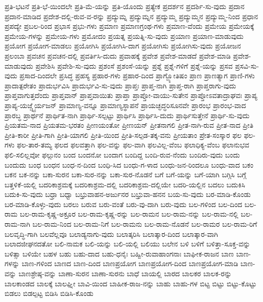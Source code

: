 ಪ್ರತಿ-ಭಟನೆ
ಪ್ರತಿ-ಭೆ-ಯಿಂದಲೇ
ಪ್ರತಿ-ಮೆ-ಯನ್ನು
ಪ್ರತಿ-ಯೊಂದು
ಪ್ರತ್ಯೇಕ
ಪ್ರದರ್ಶನ
ಪ್ರದರ್ಶಿ-ಸು-ವುದು
ಪ್ರದಾನ
ಪ್ರದಾನ-ಮಾಡಿದ
ಪ್ರದೇಶ-ದಲ್ಲಿ-ರುವ-ವ-ರನ್ನು
ಪ್ರದ್ಯುಮ್ನ
ಪ್ರದ್ಯುಮ್ನನ
ಪ್ರದ್ಯುಮ್ಮ
ಪ್ರದ್ಯುಮ್ಮನ
ಪ್ರದ್ಯುಮ್ಮ-ನಿಂದ
ಪ್ರಧಾನ
ಪ್ರಪದ್ಯೇ
ಪ್ರಬಲ-ರಿಂದ
ಪ್ರಭಾಸ
ಪ್ರಭು-ಗಳು
ಪ್ರಮಾಣ
ಪ್ರಮಾಣಗ್ರಂಥ-ಗಳು
ಪ್ರಮಾಣ-ವೆಂದು
ಪ್ರಮೇಯ
ಪ್ರಮೇಯಕ್ಕೆ
ಪ್ರಮೇಯ-ಗಳನ್ನು
ಪ್ರಮೇಯ-ಗಳು
ಪ್ರಮೋದಂ
ಪ್ರಯತ್ನ
ಪ್ರಯತ್ನಿ-ಸು-ವುದು
ಪ್ರಯಾಣ
ಪ್ರಯಾಣ-ಮಾಡುವುದು
ಪ್ರಯೋಗ
ಪ್ರಯೋಗ-ಮಾಡಲು
ಪ್ರಯೋಗಿಸಿ
ಪ್ರಯೋಗಿಸಿ-ದಾಗ
ಪ್ರಯೋಗಿಸು
ಪ್ರಯೋಗಿಸು-ವುದು
ಪ್ರಯೋಜನ
ಪ್ರಲಂಬಾ
ಪ್ರವಚನ
ಪ್ರವಚನ-ದಲ್ಲಿ
ಪ್ರವರ್ತಿಸಿ-ದುದು
ಪ್ರವಾಹಕ್ಕೆ
ಪ್ರವೇಶ
ಪ್ರವೇಶ-ಮಾಡದೆ
ಪ್ರವೇಶ-ಮಾಡಿ
ಪ್ರವೇಶ-ಮಾಡುವುದು
ಪ್ರವೇಶಿಸಿ
ಪ್ರವೇಶಿ-ಸು-ವುದು
ಪ್ರಶಂಸೆ
ಪ್ರಶಂಸೆ-ಯನ್ನು
ಪ್ರಶ್ನೆ
ಪ್ರಶ್ನೆ-ಗಳಿಗೆ
ಪ್ರಶ್ನೆ-ಯನ್ನು
ಪ್ರಸವ
ಪ್ರಸವಿ-ಸು-ವುದು
ಪ್ರಸಾದ-ದಿಂದಲೇ
ಪ್ರಸಿದ್ಧ
ಪ್ರಹಸ್ಯ
ಪ್ರಹಾರ-ಗಳು
ಪ್ರಹಾರ-ದಿಂದ
ಪ್ರಾಗ್ಜ್ಯೋತಿಷಂ
ಪ್ರಾಣ
ಪ್ರಾಣತ್ಯಾಗ
ಪ್ರಾಣಿ-ಗಳು
ಪ್ರಾದಾತ್ಪರೇತಂ
ಪ್ರಾದುರ್ಭವಿಸಿ
ಪ್ರಾದುರ್ಭವಿ-ಸು-ವುದು
ಪ್ರಾಪ್ತಃ
ಪ್ರಾಪ್ತ-ನಾಗಿ
ಪ್ರಾಪ್ತ-ರಾಗಿ
ಪ್ರಾಪ್ತರಾಗು-ವುದು
ಪ್ರಾಪ್ತವಾಗುತ್ತದೆಂದು
ಪ್ರಾಪ್ತವಾನ್
ಪ್ರಾಪ್ತವಾಯಿತು
ಪ್ರಾಪ್ತಾ
ಪ್ರಾಪ್ತೋ-ವಾಯು-ಸುತೇನ
ಪ್ರಾಪ್ತೋಽವತಾದ್ರಾಘವಃ
ಪ್ರಾಪ್ಯ
ಪ್ರಾಪ್ಯ-ಯಜ್ಚ್ನೈರ್ಯಜನ್
ಪ್ರಾಮಾಣ್ಯ-ವನ್ನೂ
ಪ್ರಾಮಾಣ್ಯಸ್ಥಾಪನೆ
ಪ್ರಾಯಚ್ಛದ್ಧರಿಸೂನವೇ
ಪ್ರಾರಂಭ
ಪ್ರಾರಂಭ-ವಾದ
ಪ್ರಾರಬ್ಧ
ಪ್ರಾರ್ಥನೆ
ಪ್ರಾರ್ಥಿತ-ನಾಗಿ
ಪ್ರಾರ್ಥಿ-ಸಲ್ಪಟ್ಟು
ಪ್ರಾರ್ಥಿಸಿ
ಪ್ರಾರ್ಥಿಸಿ-ದುದು
ಪ್ರಾರ್ಥಿಸುತ್ತೇನೆ
ಪ್ರಾರ್ಥಿ-ಸು-ವುದು
ಪ್ರಿಯತಮ-ನಾದ
ಪ್ರಿಯತಮ-ಭರತಂ
ಪ್ರೀಣಯಂತೋ
ಪ್ರೀಣಯನ್
ಪ್ರೀತನಾಗಲಿ
ಪ್ರೀತ-ನಾಗಿ-ರುವ
ಪ್ರೀತ-ನಾದ
ಪ್ರೀತಿ
ಪ್ರೀತಿ-ಕಾರೀ
ಪ್ರೀತಿ-ಗಾಗಿ
ಪ್ರೀತಿ-ಯಾಗಲಿ
ಪ್ರೀತಿ-ಯಿಂದ
ಪ್ರೀತಿ-ಸಲ್ಪಡ-ತಕ್ಕ-ವನು
ಪ್ರೀಯತಾಂ
ಪ್ರೇತ-ಸಂಸ್ಕಾರ
ಫಲ
ಫಲ-ಗಳು
ಫಲ-ತಾರ-ತಮ್ಯ
ಫಲದ
ಫಲವತ್ತಾಗಿ
ಫಲ-ವನ್ನು
ಫಲ-ವಾಗಿ
ಫಲವಿಲ್ಲ-ವೆಂಬ
ಫಲಾಧಿಕ್ಯ-ವೆಂಬ
ಫಲಾನುಭವ
ಫಲಿ-ಸಲಿಲ್ಲವೋ
ಫಲ್ಗುನಂ
ಬಂದ
ಬಂದನೋ
ಬಂದಾಗ
ಬಂದಿದ್ದ
ಬಂದಿ-ರುವ-ನೆಂದು
ಬಂದಿರು-ವುದು
ಬಂದು
ಬಂದುದು
ಬಂಧ
ಬಂಧನ
ಬಂಧ-ನ-ದಿಂದ
ಬಂಧಿ-ಸಿದ
ಬಂಧು-ಗ-ಳಾದ
ಬಂಧು-ಜನ-ರಿಂದಲೂ
ಬಂಧು-ವಾದ
ಬಕಂ
ಬಕನ
ಬಕ-ನನ್ನು
ಬಕಾ-ಸುರನ
ಬಕಾ-ಸುರ-ನನ್ನು
ಬಕಾ-ಸುರ-ನೊಡನೆ
ಬಗೆ
ಬಗೆ-ಯನ್ನು
ಬಗೆ-ಯಾಗಿ
ಬಗ್ಗಿಸಿ
ಬಗ್ಗೆ
ಬತ್ತಳಿಕೆ-ಯಲ್ಲಿ
ಬದರಿಕಾಶ್ರಮಕ್ಕೆ
ಬದರಿಕಾಶ್ರಮ-ದಲ್ಲಿ
ಬದರಿಕಾಶ್ರಮ-ದಲ್ಲಿಯೇ
ಬದರಿ-ಯಲ್ಲಿನ
ಬದಲು
ಬದುಕಿಸಿ
ಬದುಕಿ-ಸು-ವುದು
ಬಧ್ರಾ
ಬಧ್ವಾ
ಬಭ್ರುವಾಹನ-ಅರ್ಜುನರ
ಬಭ್ರುವಾ-ಹನನ
ಬಯ-ಸು-ವುದು
ಬರ-ಮಾಡಿ-ಕೊಂಡು
ಬರ-ಮಾಡಿ-ಕೊಳ್ಳು-ವುದು
ಬರಲು
ಬರುವ
ಬರು-ವಂತೆ
ಬರು-ವು-ದಾಗಿ
ಬರು-ವುದು
ಬಲ-ಗಳಿಂದ
ಬಲ-ದಿಂದ
ಬಲ-ರಾಮ
ಬಲ-ರಾಮ-ಕೃಷ್ಣ-ಅಕ್ರೂರ
ಬಲ-ರಾಮ-ಕೃಷ್ಣ-ರನ್ನು
ಬಲ-ರಾಮನ
ಬಲ-ರಾಮ-ನನ್ನು
ಬಲ-ರಾಮ-ನಲ್ಲಿ
ಬಲ-ರಾಮ-ನಾಗಿ
ಬಲ-ರಾಮ-ನಿಂದ
ಬಲ-ರಾಮ-ನಿಗೆ
ಬಲ-ರಾಮನು
ಬಲ-ರಾಮ-ನೊಡನೆ
ಬಲ-ರಾಮರ
ಬಲ-ರಾಮ-ರಿಗೆ
ಬಲವೃದ್ಧಿ-ಗಾಗಿ
ಬಲವೆಲ್ಲವೂ
ಬಲಾಡ್ಯನಾಗು-ವುದು
ಬಲಾತ್ಕರಿಸಿ
ಬಲಾತ್ಕಾರ-ದಿಂದ
ಬಲಾತ್ಕಾರ-ವಾಗಿ
ಬಲಾದಜೀಘನದತೋ
ಬಲಿ-ನಾಮಕ
ಬಲಿ-ಯನ್ನು
ಬಲಿ-ಯಲ್ಲಿ
ಬಲಿಯು
ಬಲೇನ
ಬಳಿ
ಬಳಿಗೆ
ಬಳಿತ್ತಾ-ಸೂಕ್ತ-ವನ್ನು
ಬಳಿತ್ಸಾ
ಬಳಿಯೇ
ಬಹಳ
ಬಹು
ಬಹು-ದಾದ
ಬಹು-ಧನೈಃ
ಬಹ್ವೀ-ರುವಾಹಾಂಗನಾಃ
ಬಾಘೀಕ-ರಾಜನ
ಬಾಣ
ಬಾಣ-ಗಳನ್ನು
ಬಾಣ-ಗಳಿಂದ
ಬಾಣದ
ಬಾಣ-ದಿಂದ
ಬಾಣಪ್ರಯೋಗ
ಬಾಣಪ್ರಯೋಗ-ದಿಂದ
ಬಾಣಪ್ರಯೋಗ-ಮಾಡಿ
ಬಾಣ-ವನ್ನು
ಬಾಣಶ್ರೇಷ್ಠ-ವನ್ನು
ಬಾಣಾ-ಸುರನ
ಬಾಣಾ-ಸುರನು
ಬಾಧೆ
ಬಾಯಲ್ಲಿ
ಬಾರದ
ಬಾಲಕರ
ಬಾಲಕ-ರನ್ನು
ಬಾಲಕಾಂಡದ
ಬಾಲಕ್ಕೆ
ಬಾಲಘ್ನೀ
ಬಾವಿ-ಯಿಂದ
ಬಾಹೀಕ-ರಾಜ-ನನ್ನು
ಬಾಹು
ಬಾಹು-ಗಳ
ಬಿಟ್ಟ
ಬಿಟ್ಟು
ಬಿಟ್ಟು-ಕೊಟ್ಟು
ಬಿಡಲು
ಬಿಡಲ್ಪಟ್ಟ
ಬಿಡಿಸಿ
ಬಿಡಿಸಿ-ಕೊಂಡು
